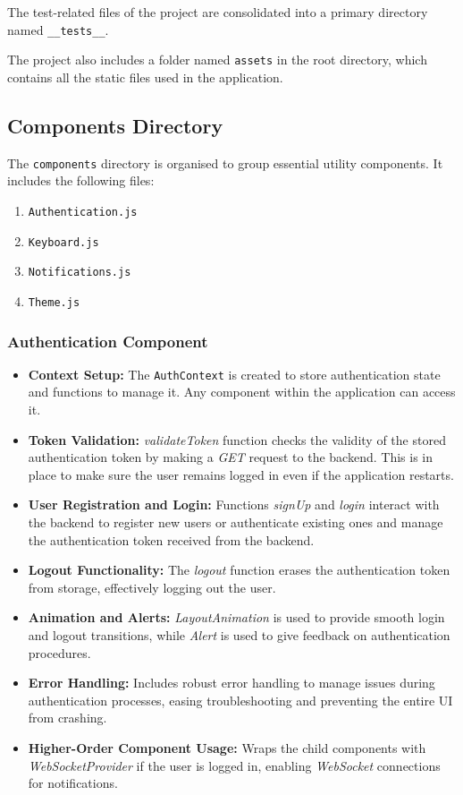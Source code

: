 The test-related files of the project are consolidated into a primary directory named \texttt{\_\_tests\_\_}.

The project also includes a folder named \texttt{assets} in the root directory, which contains all the static files used in the application.

\subsection{Components Directory}

The \texttt{components} directory is organised to group essential utility components. It includes the following files:

\begin{enumerate}
    \item \texttt{Authentication.js}
    \item \texttt{Keyboard.js}
    \item \texttt{Notifications.js}
    \item \texttt{Theme.js}
\end{enumerate}

\subsubsection{Authentication Component}

\begin{itemize}
    \item \textbf{Context Setup:} The \texttt{AuthContext} is created to store authentication state and functions to manage it. Any component within the application can access it.
    \item \textbf{Token Validation:} \textit{validateToken} function checks the validity of the stored authentication token by making a \textit{GET} request to the backend. This is in place to make sure the user remains logged in even if the application restarts.
    \item \textbf{User Registration and Login:} Functions \textit{signUp} and \textit{login} interact with the backend to register new users or authenticate existing ones and manage the authentication token received from the backend.
    \item \textbf{Logout Functionality:} The \textit{logout} function erases the authentication token from storage, effectively logging out the user.
    \item \textbf{Animation and Alerts:} \textit{LayoutAnimation} is used to provide smooth login and logout transitions, while \textit{Alert} is used to give feedback on authentication procedures.
    \item \textbf{Error Handling:} Includes robust error handling to manage issues during authentication processes, easing troubleshooting and preventing the entire UI from crashing.
    \item \textbf{Higher-Order Component Usage:} Wraps the child components with \textit{WebSocketProvider} if the user is logged in, enabling \textit{WebSocket} connections for notifications.
\end{itemize}

